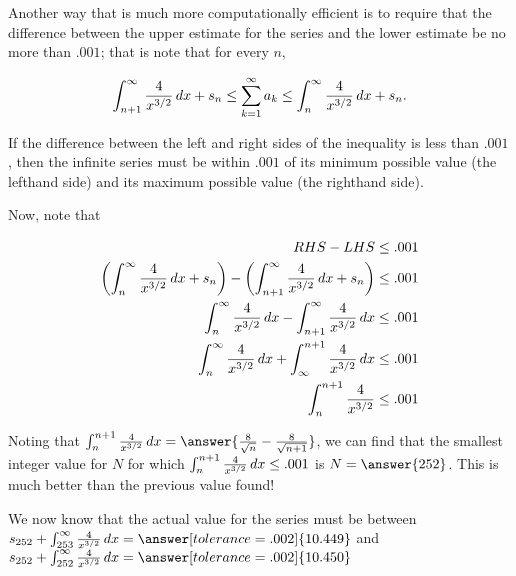\documentclass{ximera}
\begin{document}
\begin{exercise}
\begin{exercise}
\begin{hint}
Another way that is much more computationally efficient is to require that the difference between the upper estimate for the series and the lower estimate be no more than $.001$; that is note that for every $n$,

\[
\int_{n+1}^\infty \frac{4}{x^{3/2}} \mathop{}\!d x  +s_n \leq \sum_{k=1}^{\infty} a_k \leq \int_{n}^\infty \frac{4}{x^{3/2}} \mathop{}\!d x  +s_n.
\]
 
If the difference between the left and right sides of the inequality is less than $.001$, then the infinite series must be within $.001$ of its minimum possible value (the lefthand side) and its maximum possible value (the righthand side).
 
 Now, note that

\begin{align*}
RHS-LHS &\leq .001 \\
\left( \int_{n}^\infty \frac{4}{x^{3/2}} \mathop{}\!d x  +s_n\right) - \left( \int_{n+1}^\infty \frac{4}{x^{3/2}} \mathop{}\!d x  +s_n \right) &\leq .001 \\
 \int_{n}^\infty \frac{4}{x^{3/2}} \mathop{}\!d x  - \int_{n+1}^\infty \frac{4}{x^{3/2}} \mathop{}\!d x   &\leq .001 \\
  \int_{n}^\infty \frac{4}{x^{3/2}} \mathop{}\!d x  +  \int_{\infty}^{n+1} \frac{4}{x^{3/2}} \mathop{}\!d x   &\leq .001 \\
    \int_{n}^{n+1} \frac{4}{x^{3/2}}  &\leq .001 \\
\end{align*} 

Noting that $\int_n^{n+1}  \frac{4}{x^{3/2}} \d x = \answer{\frac{8}{\sqrt{n}} - \frac{8}{\sqrt{n+1}}}$, we can find that the smallest integer value for $N$ for which $\int_n^{n+1}  \frac{4}{x^{3/2}} \mathop{}\!d x \leq .001$ is $N= \answer{252}$.  This is much better than the previous value found!
 
 We now know that the actual value for the series must be between $s_{252} + \int_{253}^\infty \frac{4}{x^{3/2}} \d x = \answer[tolerance=.002]{10.449}$ and $s_{252} + \int_{252}^\infty \frac{4}{x^{3/2}} \d x = \answer[tolerance=.002]{10.450}$
\end{hint}

\end{exercise}
\end{exercise}
\end{document}
